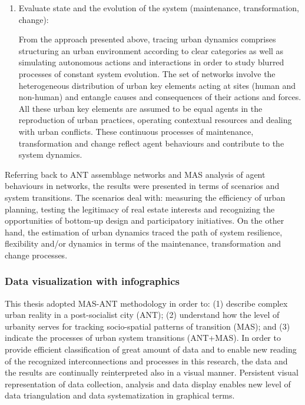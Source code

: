 \documentclass[11pt]{report}
\begin{document}
{{{{\begin{enumerate}
\item Evaluate state and the evolution of the system (maintenance, transformation, change):

From the approach presented above, tracing urban dynamics comprises structuring an urban environment according to clear categories as well as simulating autonomous actions and interactions in order to study blurred processes of constant system evolution. The set of networks involve the heterogeneous distribution of urban key elements acting at sites (human and non-human) and entangle causes and consequences of their actions and forces.  All these urban key elements are assumed to be equal agents in the reproduction of urban practices, operating contextual resources and dealing with urban conflicts.  These continuous processes of maintenance, transformation and change reflect agent behaviours and contribute to the system dynamics.
\end{enumerate}

Referring back to ANT assemblage networks and MAS analysis of agent behaviours in networks, the results were presented in terms of scenarios and system transitions. The scenarios deal with: measuring the efficiency of urban planning, testing the legitimacy of real estate interests and recognizing the opportunities of bottom-up design and participatory initiatives. On the other hand, the estimation of urban dynamics traced the path of system resilience, flexibility and/or dynamics in terms of the maintenance, transformation and change processes.


\subsubsection{Data visualization with infographics}

This thesis adopted MAS-ANT methodology in order to:
(1) describe complex urban reality in a post-socialist city (ANT);
(2) understand how the level of urbanity serves for tracking socio-spatial patterns of transition (MAS);
and
(3) indicate the processes of urban system transitions (ANT+MAS).
In order to provide efficient classification of great amount of data and to enable new reading of the recognized interconnections and processes in this research, the data and the results are continually reinterpreted also in a visual manner.
Persistent visual representation of data collection, analysis and data display enables new level of data triangulation and data systematization in graphical terms.
\\

}}}}
\end{document}
